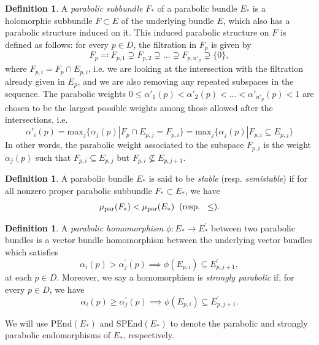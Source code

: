 \documentclass[11pt, reqno]{amsart}
\numberwithin{equation}{section}
\theoremstyle{definition}
\newtheorem{definition}[theorem]{Definition}
\begin{document}
\begin{definition}
	A \textit{parabolic subbundle} $F_*$ of a parabolic bundle $E_*$ is a holomorphic subbundle $F\subset E$ of the underlying bundle $E$, which also has a parabolic structure induced on it. This induced parabolic structure on $F$ is defined as follows: for every $p\in D$, the filtration in $F_p$ is given by 
	\[
		F_p \eqqcolon F_{p,1}\supsetneq F_{p,2} \supsetneq \dots \supsetneq F_{p,n'_p} \supsetneq \{0\},
	\]
	where $F_{p,i}= F_p \cap E_{p,i}$, i.e. we are looking at the intersection with the filtration already given in $E_p$, and we are also removing any repeated subspaces in the sequence. The parabolic weights $0\leq \alpha'_1(p) < \alpha'_2(p) < \dots < \alpha'_{n'_p}(p) < 1$ are chosen to be the largest possible weights among those allowed after the intersections, i.e. 
	\[
	\alpha'_i(p) = \mathrm{max}_j\{\alpha_j(p)| F_p \cap E_{p,j}=F_{p,i} \}=\mathrm{max}_j\{\alpha_j(p)| F_{p,i}\subseteq E_{p,j} \}
	\]
	In other words, the parabolic weight associated to the subspace $F_{p,i}$ is the weight $\alpha_j(p)$ such that $F_{p,i}\subseteq E_{p,j}$ but $F_{p,i}\nsubseteq E_{p,j+1}$.
\end{definition}
\begin{definition}
	A parabolic bundle $E_*$ is said to be \textit{stable} (resp. \textit{semistable}) if for all nonzero proper parabolic subbundle $F_* \subset E_*$, we have
	\[
	\mu_{\mathrm{par}}(F_*) < \mu_{\mathrm{par}}(E_*) \hspace{0.2cm} (\mathrm{resp. } \hspace{0.2cm} \leq).
	\]
\end{definition}
\begin{definition}
A \textit{parabolic homomorphism} $\phi: E_* \to E^\prime_*$ between two parabolic bundles is a vector bundle homomorphism between the underlying vector bundles which satisfies 
\[
\alpha_i(p) > \alpha_j^\prime(p) \implies \phi(E_{p,i}) \subseteq E_{p,j+1}^\prime,
\]
at each $p \in D$. Moreover, we say a homomorphism is \textit{strongly parabolic} if, for every $p \in D$, we have
\[ \alpha_i(p) \geq \alpha_j^\prime(p) \implies \phi(E_{p,i}) \subseteq E_{p,j+1}^\prime.
\]
\end{definition}

We will use $\mathrm{PEnd}(E_*)$ and $\mathrm{SPEnd}(E_*)$ to denote the parabolic and strongly parabolic endomorphisms of $E_*$, respectively.
\end{document}

